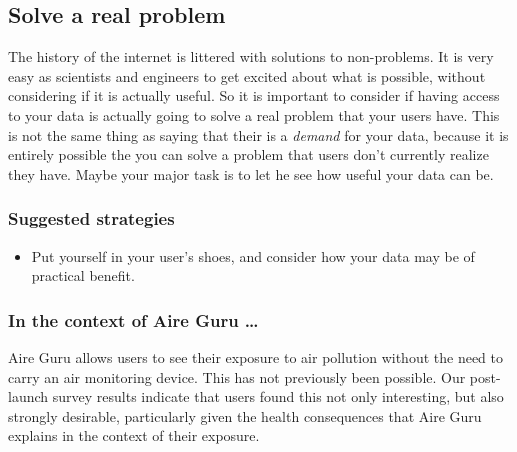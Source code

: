 \subsection{Solve a real problem}

The history of the internet is littered with solutions to non-problems.
It is very easy as scientists and engineers to get excited about what is possible, without considering if it is actually
useful. So it is important to consider if having access to your data is actually going to solve a real problem that your
users have. This is not the same thing as saying that their is a \emph{demand} for your data, because it is entirely possible 
the you can solve a problem that users don't currently realize they have.
Maybe your major task is to let he see how useful your data can be.\\

\subsubsection*{Suggested strategies} 

\begin{itemize}
    \item Put yourself in your user's shoes, and consider how your data may be of practical benefit.
\end{itemize}

\subsubsection*{In the context of Aire Guru \ldots} 

Aire Guru allows users to see their exposure to air pollution without the need to carry an air monitoring device.
This has not previously been possible. 
Our post-launch survey results indicate that users found this not only interesting, but also strongly desirable, 
particularly given the health consequences that Aire Guru explains in the context of their exposure.\\

